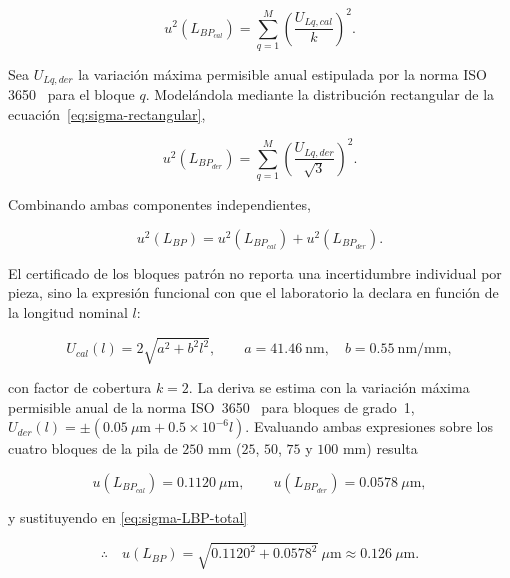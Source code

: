 \begin{equation}
    u^2(L_{BP_{cal}}) = \sum_{q=1}^M \left(\frac{U_{Lq,cal}}{k}\right)^2 .
    \label{eq:sigma-BP-cal}
\end{equation}

Sea $U_{Lq,der}$ la variación máxima permisible anual estipulada por la norma ISO
3650~\parencite{iso3650_1998} para el bloque $q$. Modelándola mediante la
distribución rectangular de la ecuación~\eqref{eq:sigma-rectangular},

\begin{equation}
    u^2(L_{BP_{der}}) = \sum_{q=1}^M \left(\frac{U_{Lq,der}}{\sqrt{3}}\right)^2 .
    \label{eq:sigma-BP-der}
\end{equation}

Combinando ambas componentes independientes,

\begin{equation}
    u^2(L_{BP}) = u^2(L_{BP_{cal}}) + u^2(L_{BP_{der}}) .
    \label{eq:sigma-LBP-total}
\end{equation}

El certificado de los bloques patrón no reporta una incertidumbre individual por
pieza, sino la expresión funcional con que el laboratorio la declara en función de la
longitud nominal $l$:

\begin{equation}
    U_{cal}(l) = 2\sqrt{a^2 + b^2 l^2},
    \qquad a = 41.46\ \text{nm},\quad b = 0.55\ \text{nm/mm},
    \label{eq:Ucal-bloque}
\end{equation}

con factor de cobertura $k = 2$. La deriva se estima con la variación máxima
permisible anual de la norma ISO~3650~\parencite{iso3650_1998} para bloques de
grado~1,
$U_{der}(l) = \pm(0.05\ \mu\text{m} + 0.5\times10^{-6}l)$. Evaluando ambas expresiones
sobre los cuatro bloques de la pila de $250$ mm ($25$, $50$, $75$ y $100$ mm)
resulta

\begin{equation}
    u(L_{BP_{cal}}) = 0.1120\ \mu\text{m},
    \qquad u(L_{BP_{der}}) = 0.0578\ \mu\text{m},
    \label{eq:sigma-BP-valor}
\end{equation}

y sustituyendo en \eqref{eq:sigma-LBP-total}

\begin{equation}
    \therefore\quad u(L_{BP}) = \sqrt{0.1120^2 + 0.0578^2}\ \mu\text{m}
    \approx 0.126\ \mu\text{m}.
    \label{eq:sigma-LBP-total-valor}
\end{equation}

